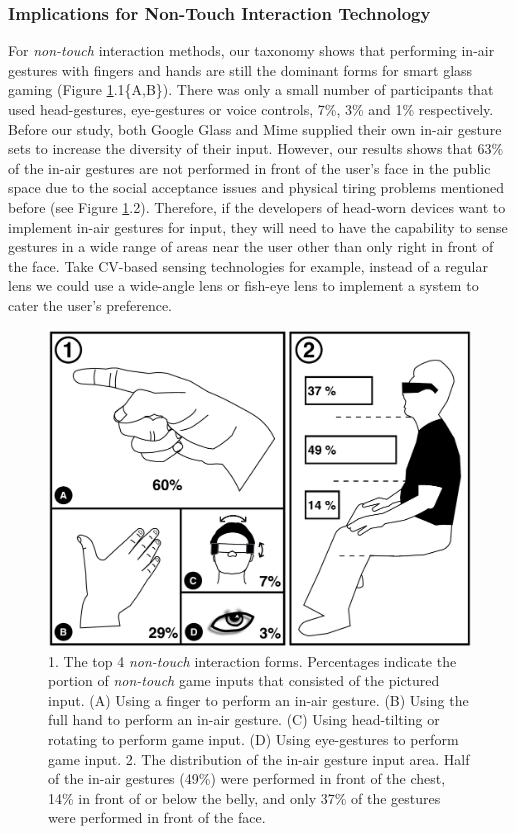 \documentclass{sigchi}
\begin{document}
    \subsubsection{Implications for Non-Touch Interaction Technology}
    For \emph{non-touch} interaction methods, our taxonomy shows that performing in-air gestures with fingers and hands are still the dominant forms for smart glass gaming (Figure \ref{fig:figureInAirPorpotion}.1\{A,B\}). There was only a small number of participants that used head-gestures, eye-gestures or voice controls, 7\%, 3\% and 1\% respectively.
    Before our study, both Google Glass and Mime\cite{GoogleGlass, Colaco:2013:MCL:2501988.2502042} supplied their own in-air gesture sets to increase the diversity of their input. However, our results shows that 63\% of the in-air gestures are not performed in front of the user's face in the public space due to the social acceptance issues and physical tiring problems mentioned before (see Figure \ref{fig:figureInAirPorpotion}.2). Therefore, if the developers of head-worn devices want to implement in-air gestures for input, they will need to have the capability to sense gestures in a wide range of areas near the user other than only right in front of the face. Take CV-based sensing technologies for example, instead of a regular lens we could use a wide-angle lens or fish-eye lens to implement a system to cater the user's preference.   
  \begin{figure}[!h]
  \centering
  \includegraphics[width=0.9\columnwidth]{InAirControlArea.pdf}
  \caption{1. The top 4 \emph{non-touch} interaction forms. Percentages indicate the portion of \emph{non-touch} game inputs that consisted of the pictured input. (A) Using a finger to perform an in-air gesture. (B) Using the full hand to perform an in-air gesture. (C) Using head-tilting or rotating to perform game input. (D) Using eye-gestures to perform game input. 2. The distribution of the in-air gesture input area. Half of the in-air gestures (49\%) were performed in front of the chest, 14\% in front of or below the belly, and only 37\% of the gestures were performed in front of the face.}
  \label{fig:figureInAirPorpotion}
  \end{figure}
\end{document}
